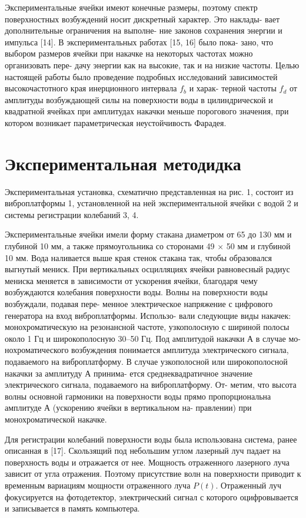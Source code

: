 Экспериментальные ячейки имеют конечные размеры, поэтому спектр поверхностных возбуждений носит дискретный характер. Это наклады- вает дополнительные ограничения на выполне- ние законов сохранения энергии и импульса [14]. В экспериментальных работах [15, 16] было пока- зано, что выбором размеров ячейки при накачке на некоторых частотах можно организовать пере- дачу энергии как на высокие, так и на низкие частоты.
Целью настоящей работы было проведение подробных исследований зависимостей высокочастотного края инерционного интервала $f_b$ и харак- терной частоты $f_d$ от амплитуды возбуждающей силы на поверхности воды в цилиндрической и квадратной ячейках при амплитудах накачки меньше порогового значения, при котором возникает параметрическая неустойчивость Фарадея.
\section{Экспериментальная методидка} \label{sect2_1}

Экспериментальная установка, схематично представленная на рис. 1, состоит из виброплатформы 1, установленной на ней экспериментальной ячейки с водой 2 и системы регистрации колебаний 3, 4.

Экспериментальные ячейки имели форму стакана диаметром от 65 до 130 мм и глубиной 10 мм, а также прямоугольника со сторонами 49 $\times$ 50 мм и глубиной 10 мм. Вода наливается выше края стенок стакана так, чтобы образовался выгнутый мениск. При вертикальных осцилляциях ячейки равновесный радиус мениска меняется в зависимости от ускорения ячейки, благодаря чему возбуждаются колебания поверхности воды. Волны на поверхности воды возбуждали, подавая пере- менное электрическое напряжение с цифрового генератора на вход виброплатформы. Использо- вали следующие виды накачек: монохроматическую на резонансной частоте, узкополосную с шириной полосы около 1 Гц и широкополосную 30–50 Гц. Под амплитудой накачки А в случае мо- нохроматического возбуждения понимается амплитуда электрического сигнала, подаваемого на виброплатформу. В случае узкополосной или широкополосной накачки за амплитуду А принима- ется среднеквадратичное значение электрического сигнала, подаваемого на виброплатформу. От- метим, что высота волны основной гармоники на поверхности воды прямо пропорциональна амплитуде А (ускорению ячейки в вертикальном на- правлении) при монохроматической накачке.

Для регистрации колебаний поверхности воды была использована система, ранее описанная в [17]. Скользящий под небольшим углом лазерный луч падает на поверхность воды и отражается от нее. Мощность отраженного лазерного луча зависит от угла отражения. Поэтому присутствие волн на поверхности приводит к временным вариациям мощности отраженного луча $P(t)$. Отраженный луч фокусируется на фотодетектор, электрический сигнал с которого оцифровывается и записывается в память компьютера.

